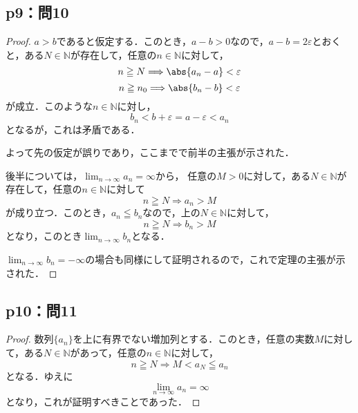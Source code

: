 \documentclass[uplatex,dvipdfmx,a4paper,10pt,fleqn]{jsarticle}
\begin{document}
\newpage 


    \subsection*{p9：問10}
    

\begin{tleftbar}
    \begin{proof}
        $a>b$であると仮定する．このとき，$a-b >0$なので，$a-b=2 \varepsilon$とおくと，ある$N \in \mathbb{N}$が存在して，任意の$n \in \mathbb{N}$に対して，
        \[
            n \geqq N \Longrightarrow \abs{a_n -a} < \varepsilon
        \]
        \[
            n \geqq n_0 \Longrightarrow \abs{b_n -b} <\varepsilon
        \]
        が成立．このような$n \in \mathbb{N}$に対し，
        \[
            b_n< b+\varepsilon = a-\varepsilon < a_n
        \]
        となるが，これは矛盾である．
        
        よって先の仮定が誤りであり，ここまでで前半の主張が示された．

        後半については，$\lim_{n \to \infty} a_n = \infty$から，
        任意の$M >0$に対して，ある$N \in \mathbb{N}$が存在して，任意の$n \in \mathbb{N}$に対して
        \[
            n \geqq N \Longrightarrow a_n >M 
        \]
        が成り立つ．このとき，$a_n \leqq b_n$なので，上の$N\in \mathbb{N}$に対して，
        \[
            n \geqq N \Longrightarrow b_n >M
        \]
        となり，このとき$\lim_{n \to \infty} b_n $となる．

        $\lim_{n \to \infty} b_n = -\infty$の場合も同様にして証明されるので，これで定理の主張が示された．
    \end{proof}
    \end{tleftbar}


    \subsection*{p10：問11}

    \begin{tleftbar}
        \begin{proof}
        数列$\{ a_n \}$を上に有界でない増加列とする．このとき，任意の実数$M$に対して，ある$N \in \mathbb{N}$があって，任意の$n \in \mathbb{N}$に対して，
        \[
            n \geqq N \Longrightarrow  M < a_N \leqq a_n
        \]
        となる．ゆえに
        \[
            \lim_{n \to \infty} a_n=\infty
        \]
        となり，これが証明すべきことであった．
        \end{proof}
    \end{tleftbar}
    
\end{document}
